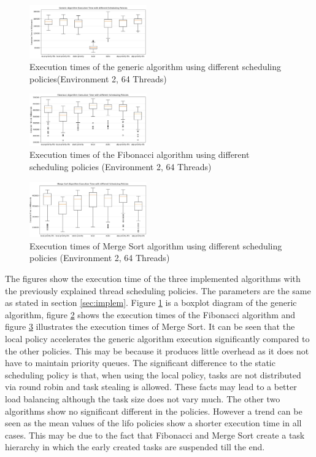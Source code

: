 \begin{figure}[h]
	\centering
	\includegraphics[width=0.45\textwidth]{figures/genSchedule.JPG}
	\caption{Execution times of the generic algorithm using different scheduling policies(Environment 2, 64 Threads)}
	\label{fig:gen_Schedule}
\end{figure}
\begin{figure}[h]
	\centering
	\includegraphics[width=0.45\textwidth]{figures/fibSchedule.JPG}
	\caption{Execution times of the Fibonacci algorithm using different scheduling policies (Environment 2, 64 Threads)}
	\label{fig:fib_Schedule}
\end{figure}
\begin{figure}[h]
	\centering
	\includegraphics[width=0.45\textwidth]{figures/sortSchedule.JPG}
	\caption{Execution times of Merge Sort algorithm using different scheduling policies (Environment 2, 64 Threads)}
	\label{fig:sort_Schedule}
\end{figure}

The figures show the execution time of the three implemented algorithms with the previously explained thread scheduling policies.
The parameters are the same as stated in section \ref{sec:implem}.
Figure \ref{fig:gen_Schedule} is a boxplot diagram of the generic algorithm, figure \ref{fig:fib_Schedule} shows the execution times of the Fibonacci algorithm and figure \ref{fig:sort_Schedule} illustrates the execution times of Merge Sort.
It can be seen that the local policy accelerates the generic algorithm execution significantly compared to the other policies.
This may be because it produces little overhead as it does not have to maintain priority queues.
The significant difference to the static scheduling policy is that, when using the local policy, tasks are not distributed via round robin and task stealing is allowed.
These facts may lead to a better load balancing although the task size does not vary much.
The other two algorithms show no significant different in the policies.
However a trend can be seen as the mean values of the lifo policies show a shorter execution time in all cases.
This may be due to the fact that Fibonacci and Merge Sort create a task hierarchy in which the early created tasks are suspended till the end.

